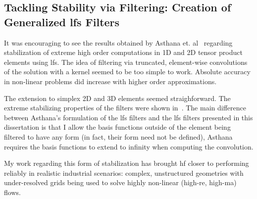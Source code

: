 \subsection{Tackling Stability via Filtering: Creation of Generalized \gls{lfs} Filters}
It was encouraging to see the results obtained by Asthana et. al~\cite{asthana2014} regarding stabilization of extreme high order computations in 1D and 2D tensor product elements using \gls{lfs}. The idea of filtering via truncated, element-wise convolutions of the solution with a kernel seemed to be too simple to work. Absolute accuracy in non-linear problems did increase with higher order approximations.

The extension to simplex 2D and 3D elements seemed straighforward. The extreme stabilizing properties of the filters were shown in~\cite{lopez2015stabilization}. The main difference between Asthana's formulation of the \gls{lfs} filters and the \gls{lfs} filters presented in this dissertation is that I allow the basis functions outside of the element being filtered to have any form (in fact, their form need not be defined), Asthana requires the basis functions to extend to infinity when computing the convolution.

My work regarding this form of stabilization has brought \gls{hf} closer to performing reliably in realistic industrial scenarios: complex, unstructured geometries with under-resolved grids being used to solve highly non-linear (high-\gls{re}, high-\gls{ma}) flows.





